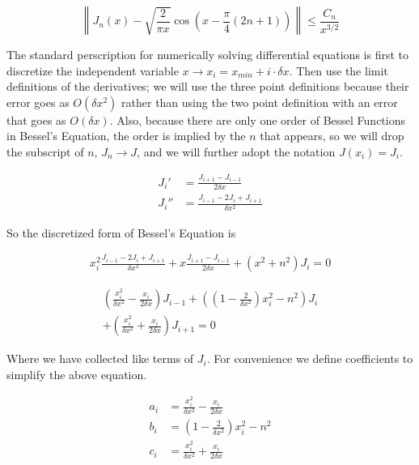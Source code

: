 \documentclass[twocolumn, groupedaddress]{revtex4-1}
\begin{document}
\begin{equation}
\left\| J_n(x) - \sqrt{\frac{2}{\pi x}} \cos \left( x - \frac{\pi}{4} (2n+1) \right) \right\| \leq \frac{C_n}{x^{3/2}}
\end{equation}

The standard perscription for numerically solving differential equations is first to discretize the independent variable $x \to x_i = x_{min} + i \cdot \delta x$.  Then use the limit definitions of the derivatives; we will use the three point definitions because their error goes as $O(\delta x^2)$ rather than using the two point definition with an error that goes as $O(\delta x)$.  Also, because there are only one order of Bessel Functions in Bessel's Equation, the order is implied by the $n$ that appears, so we will drop the subscript of $n$, $J_n \to J$, and we will further adopt the notation $J(x_i) = J_i$.

\begin{align}
J_i'  &= \frac{J_{i+1} - J_{i-1}}{2 \delta x} \\
J_i'' &= \frac{J_{i-1} - 2J_{i} + J_{i+1}}{\delta x^2}
\end{align}

So the discretized form of Bessel's Equation is

\begin{align}
\label{eqn:Bessel's Equation Discretized}
x_i^2 \frac{J_{i-1} - 2J_{i} + J_{i+1}}{\delta x^2} + x \frac{J_{i+1} - J_{i-1}}{2 \delta x} + (x^2 + n^2) J_i = 0
\end{align}

\begin{align}
\left(\frac{x_i^2}{\delta x^2} - \frac{x_i}{2\delta x}\right) J_{i-1}			\nonumber
	+ \left( \left(1-\frac{2}{\delta x^2}\right)x_i^2 - n^2 \right) J_i		\\
	+ \left(\frac{x_i^2}{\delta x^2} + \frac{x_i}{2\delta x}\right) J_{i+1}
	= 0
\end{align}

Where we have collected like terms of $J_i$.  For convenience we define coefficients to simplify the above equation.

\begin{align}
a_i &= \frac{x_i^2}{\delta x^2} - \frac{x_i}{2\delta x} 	\\
b_i &= \left(1-\frac{2}{\delta x^2}\right)x_i^2 - n^2  	\\
c_i &= \frac{x_i^2}{\delta x^2} + \frac{x_i}{2\delta x}
\end{align}
\end{document}
